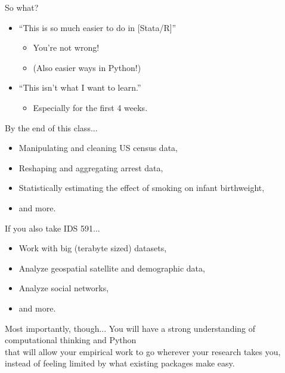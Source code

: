 \documentclass[11pt]{beamer}
\begin{document}
\begin{frame}[c]{So what?}
\begin{itemize}
	\pause \item ``This is so much easier to do in [Stata/R]'' \\
	\begin{itemize}
		\item You're not wrong!
		\pause \item (Also easier ways in Python!)
	\end{itemize}
	\pause \item ``This isn't what I want to learn.''
	\begin{itemize}
		\item Especially for the first 4 weeks.
	\end{itemize}
\end{itemize}
\end{frame}

\begin{frame}[c]{By the end of this class...}
\begin{itemize}
	\item Manipulating and cleaning US census data,
	\pause \item Reshaping and aggregating arrest data,
	\pause \item Statistically estimating the effect of smoking on infant birthweight,
	\pause \item and more.
\end{itemize}
\end{frame}

\begin{frame}[c]{If you also take IDS 591...}
\begin{itemize}
	\item Work with big (terabyte sized) datasets,
	\pause \item Analyze geospatial satellite and demographic data,
	\pause \item Analyze social networks,
	\pause \item and more.
\end{itemize}
\end{frame}

\begin{frame}[c]{Most importantly, though...}
You will have a strong understanding of computational thinking and Python\\
\pause that will allow your empirical work to go wherever your research takes you, \\
\pause instead of feeling limited by what existing packages make easy.
\end{frame}
\end{document}
